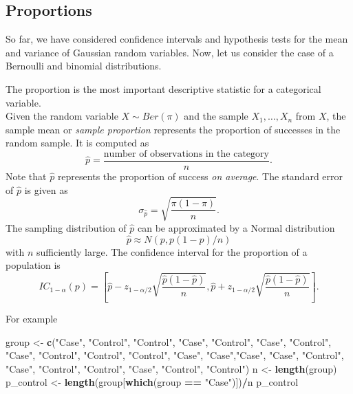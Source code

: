 \documentclass[
]{article}
\newenvironment{Shaded}{\begin{snugshade}}{\end{snugshade}}
\newcommand{\FunctionTok}[1]{\textcolor[rgb]{0.13,0.29,0.53}{\textbf{#1}}}
\newcommand{\NormalTok}[1]{#1}
\newcommand{\OtherTok}[1]{\textcolor[rgb]{0.56,0.35,0.01}{#1}}
\newcommand{\SpecialCharTok}[1]{\textcolor[rgb]{0.81,0.36,0.00}{\textbf{#1}}}
\newcommand{\StringTok}[1]{\textcolor[rgb]{0.31,0.60,0.02}{#1}}
\begin{document}
\hypertarget{proportions}{%
\subsection{Proportions}\label{proportions}}

So far, we have considered confidence intervals and hypothesis tests for
the mean and variance of Gaussian random variables. Now, let us consider
the case of a Bernoulli and binomial distributions.

The proportion is the most important descriptive statistic for a
categorical variable.\\
Given the random variable \(X \sim Ber(\pi)\) and the sample
\(X_1, \ldots, X_n\) from \(X\), the sample mean or \emph{sample
proportion} represents the proportion of successes in the random sample.
It is computed as
\[\hat{p} = \frac{\mbox{number of observations in the category}}{n}.\]
Note that \(\hat p\) represents the proportion of success \emph{on
average}. The standard error of \(\hat p\) is given as
\[\sigma_{\hat p} = \sqrt{\frac{\pi (1-\pi)}{n}}.\] The sampling
distribution of \(\hat{p}\) can be approximated by a Normal distribution
\[\hat{p} \approx N(p, p(1-p)/n)\] with \(n\) sufficiently large. The
confidence interval for the proportion of a population is
\[IC_{1-\alpha}(p) = \left[ \hat{p} - z_{1-\alpha/2}\sqrt{\frac{\hat{p}(1 - \hat{p})}{n}}, \hat{p} + z_{1-\alpha/2}\sqrt{\frac{\hat{p}(1 - \hat{p})}{n}} \right].\]

For example

\begin{Shaded}
\begin{Highlighting}[]
\NormalTok{group }\OtherTok{\textless{}{-}} \FunctionTok{c}\NormalTok{(}\StringTok{"Case"}\NormalTok{, }\StringTok{"Control"}\NormalTok{, }\StringTok{"Control"}\NormalTok{, }\StringTok{"Case"}\NormalTok{, }\StringTok{"Control"}\NormalTok{, }\StringTok{"Case"}\NormalTok{, }\StringTok{"Control"}\NormalTok{, }\StringTok{"Case"}\NormalTok{, }\StringTok{"Control"}\NormalTok{, }\StringTok{"Control"}\NormalTok{, }\StringTok{"Control"}\NormalTok{, }\StringTok{"Case"}\NormalTok{, }\StringTok{"Case"}\NormalTok{,}\StringTok{"Case"}\NormalTok{, }\StringTok{"Case"}\NormalTok{, }\StringTok{"Control"}\NormalTok{, }\StringTok{"Case"}\NormalTok{, }\StringTok{"Control"}\NormalTok{, }\StringTok{"Control"}\NormalTok{, }\StringTok{"Case"}\NormalTok{, }\StringTok{"Control"}\NormalTok{, }\StringTok{"Control"}\NormalTok{)}
\NormalTok{n }\OtherTok{\textless{}{-}} \FunctionTok{length}\NormalTok{(group)}
\NormalTok{p\_control }\OtherTok{\textless{}{-}} \FunctionTok{length}\NormalTok{(group[}\FunctionTok{which}\NormalTok{(group }\SpecialCharTok{==} \StringTok{"Case"}\NormalTok{)])}\SpecialCharTok{/}\NormalTok{n}
\NormalTok{p\_control}
\end{Highlighting}
\end{Shaded}
\end{document}
